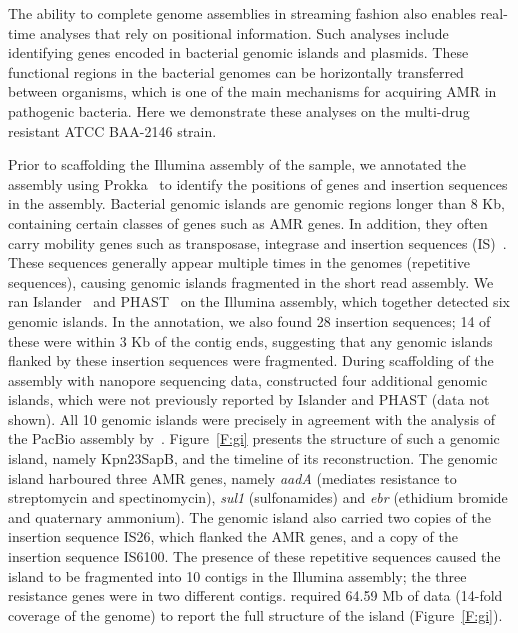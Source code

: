 The ability to complete genome assemblies in streaming fashion also enables
real-time analyses that rely on positional information. Such analyses include
identifying genes encoded in bacterial genomic islands and plasmids. These
functional regions in the bacterial genomes can be horizontally transferred
between organisms, which is one of the main mechanisms for acquiring AMR in
pathogenic bacteria. Here we demonstrate these analyses on the multi-drug
resistant \kp{} ATCC BAA-2146 strain.

Prior to scaffolding the Illumina assembly of the sample, we annotated the
assembly using Prokka~\cite{Seemann2014} to identify the positions of genes and
insertion sequences in the assembly. Bacterial genomic islands are genomic
regions longer than 8 Kb, containing certain classes of genes such as AMR genes.
In addition, they often carry mobility genes such as transposase, integrase and
insertion sequences (IS)~\cite{LangilleHB2010}. These sequences generally
appear multiple times in the genomes (repetitive sequences), causing genomic
islands fragmented in the short read assembly. We ran Islander~\cite{MantriW2004}
and PHAST~\cite{ZhouLL2011} on the Illumina assembly, which together detected
six genomic islands. In the annotation, we also found 28 insertion sequences; 14
of these were within 3 Kb of the contig ends, suggesting that any genomic
islands flanked by these insertion sequences were fragmented. During scaffolding
of the assembly with nanopore sequencing data, \npscarf{} constructed four
additional genomic islands, which were not previously reported by Islander and
PHAST (data not shown). All 10 genomic islands were precisely in agreement with 
the analysis of the PacBio assembly by~\cite{HudsonBM2014}. Figure~\ref{F:gi}
presents the structure of such a genomic island, namely Kpn23SapB, and the
timeline of its reconstruction. The genomic island harboured three AMR genes, 
namely \emph{aadA} (mediates resistance to streptomycin and spectinomycin), 
\emph{sul1} (sulfonamides) and \emph{ebr} (ethidium bromide and quaternary
ammonium). The genomic island also carried two copies of the insertion sequence 
IS26, which flanked the AMR genes, and a copy of the insertion sequence IS6100.
The presence of these repetitive sequences caused the island to be fragmented 
into 10 contigs in the Illumina assembly; the three resistance genes were in two
different contigs. \npscarf{} required 64.59 Mb of data (14-fold coverage of the 
genome) to report the full structure of the island (Figure~\ref{F:gi}).


